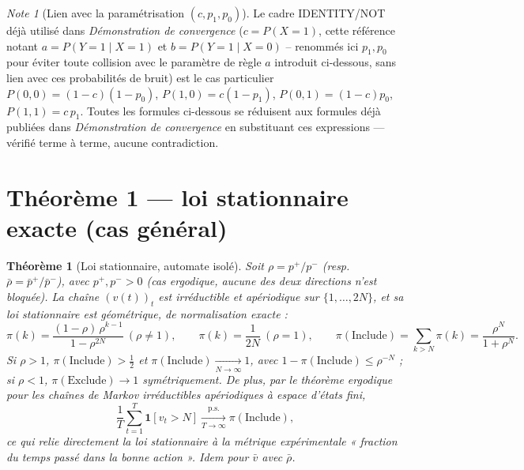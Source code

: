 \documentclass[12pt,a4paper]{article}
\newtheorem{theorem}{Théorème}[section]
\theoremstyle{remark}
\newtheorem{note}{Note}[section]
\newcommand{\Inc}{\ensuremath{\mathrm{Include}}}
\newcommand{\Exc}{\ensuremath{\mathrm{Exclude}}}
\newcommand{\vbar}{\bar{v}}
\begin{document}
\begin{note}[Lien avec la paramétrisation $(c,p_1,p_0)$]
Le cadre IDENTITY/NOT déjà utilisé dans \textit{Démonstration de convergence}
($c{=}P(X{=}1)$, cette référence notant $a{=}P(Y{=}1\mid X{=}1)$ et
$b{=}P(Y{=}1\mid X{=}0)$ -- renommés ici $p_1,p_0$ pour éviter toute collision
avec le paramètre de règle $a$ introduit ci-dessous, sans lien avec ces
probabilités de bruit) est le cas particulier
$P(0,0){=}(1{-}c)(1{-}p_0)$, $P(1,0){=}c(1{-}p_1)$, $P(0,1){=}(1{-}c)p_0$,
$P(1,1){=}c\,p_1$. Toutes les formules ci-dessous se réduisent aux formules
déjà publiées dans \textit{Démonstration de convergence} en substituant ces
expressions --- vérifié terme à terme, aucune contradiction.
\end{note}

\section{Théorème 1 --- loi stationnaire exacte (cas général)}

\begin{theorem}[Loi stationnaire, automate isolé]\label{thm:stationnaire}
Soit $\rho = p^+/p^-$ (resp.\ $\bar\rho=\bar p^+/\bar p^-$), avec $p^+,p^->0$
(cas ergodique, aucune des deux directions n'est bloquée). La chaîne $(v(t))_t$
est irréductible et apériodique sur $\{1,\ldots,2N\}$, et sa loi stationnaire
est géométrique, de normalisation exacte :
\[
  \pi(k) = \frac{(1-\rho)\,\rho^{k-1}}{1-\rho^{2N}} \ (\rho\ne1), \qquad
  \pi(k) = \frac1{2N} \ (\rho=1), \qquad
  \boxed{\pi(\Inc) = \sum_{k>N}\pi(k) = \frac{\rho^N}{1+\rho^N}.}
\]
Si $\rho>1$, $\pi(\Inc)>\tfrac12$ et $\pi(\Inc)\xrightarrow[N\to\infty]{}1$, avec
$1-\pi(\Inc)\le\rho^{-N}$ ; si $\rho<1$, $\pi(\Exc)\to1$ symétriquement. De plus,
par le théorème ergodique pour les chaînes de Markov irréductibles apériodiques
à espace d'états fini,
\[
  \frac1T\sum_{t=1}^{T}\mathbf 1[v_t>N] \xrightarrow[T\to\infty]{\text{p.s.}} \pi(\Inc),
\]
ce qui relie directement la loi stationnaire à la métrique expérimentale
« fraction du temps passé dans la bonne action ». Idem pour $\vbar$ avec $\bar\rho$.
\end{theorem}
\end{document}
